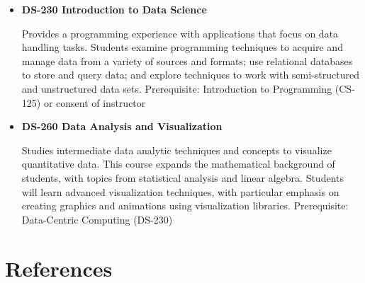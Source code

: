 \documentclass[
  letterpaper,
]{scrbook}
\newlength{\cslhangindent}
\newlength{\cslentryspacingunit} %
\newenvironment{CSLReferences}[2] %
 {%
  \setlength{\parindent}{0pt}
  \ifodd #1
  \let\oldpar\par
  \def\par{\hangindent=\cslhangindent\oldpar}
  \fi
  \setlength{\parskip}{#2\cslentryspacingunit}
 }%
 {}
\begin{document}
\begin{itemize}
\item
  \textbf{DS-230 Introduction to Data Science}

  Provides a programming experience with applications that focus on data
  handling tasks. Students examine programming techniques to acquire and
  manage data from a variety of sources and formats; use relational
  databases to store and query data; and explore techniques to work with
  semi-structured and unstructured data sets. Prerequisite: Introduction
  to Programming (CS-125) or consent of instructor
\item
  \textbf{DS-260 Data Analysis and Visualization}

  Studies intermediate data analytic techniques and concepts to
  visualize quantitative data. This course expands the mathematical
  background of students, with topics from statistical analysis and
  linear algebra. Students will learn advanced visualization techniques,
  with particular emphasis on creating graphics and animations using
  visualization libraries. Prerequisite: Data-Centric Computing (DS-230)
\end{itemize}


\hypertarget{references}{%
\chapter*{References}\label{references}}


\hypertarget{refs}{}
\begin{CSLReferences}{0}{0}
\end{CSLReferences}

\backmatter
\printindex
\end{document}
